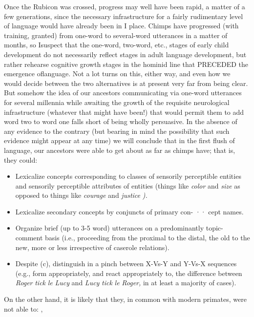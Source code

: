 Once the Rubicon was crossed, progress may well have been rapid, a matter of a few generations, since the necessary infrastructure for a fairly rudimentary level of language would have already been in
I
place. Chimps have progressed (with training, granted) from one-word to several-word utterances in a matter of months, so Isuspect that the one-word, two-word, etc., stages of early child development do not necessarily reflect stages in adult language development, but rather rehearse cognitive growth stages in the hominid line that PRECEDED
the emergence oflanguage. Not a lot turns on this, either way, and even how we would decide between the two alternatives is at present very far from being clear. But somehow the idea of our ancestors communi\-cating via one-word utterances for several millennia while awaiting the growth of the requisite neurological infrastructure (whatever that might
have been!) that would permit them to add word two to word one falls short of being wholly persuasive. In the absence of any evidence to the contrary (but bearing in mind the possibility that such evidence might appear at any time) we will conclude that in the first flush of language, our ancestors were able to get about as far as chimps have; that is, they could:


\begin{itemize}
\item Lexicalize concepts corresponding to classes of sensorily perceptible entities and sensorily perceptible attributes of entities (things like \textit{color} and \textit{size} as opposed to things like \textit{courage} and \textit{justice} \textit{).}
\item Lexicalize secondary concepts by conjuncts of primary con- ·· cept names.
\item Organize brief (up to 3-5 word) utterances on a predominantly topic-comment basis (i.e., proceeding from the proximal to the distal, the old to the new, more or less irrespective of case\-role relations).
\item Despite (c), distinguish in a pinch between X-Vs-Y and Y-Vs-X sequences (e.g., form appropriately, and react appropriately to, the difference between \textit{Roger} \textit{tick} \textit{le} \textit{Lucy} and \textit{Lucy} \textit{tick} \textit{le} \textit{Roger,} in at least a majority of cases).
\end{itemize}

On the other hand, it is likely that they, in common with modern primates, were not able to: ,

